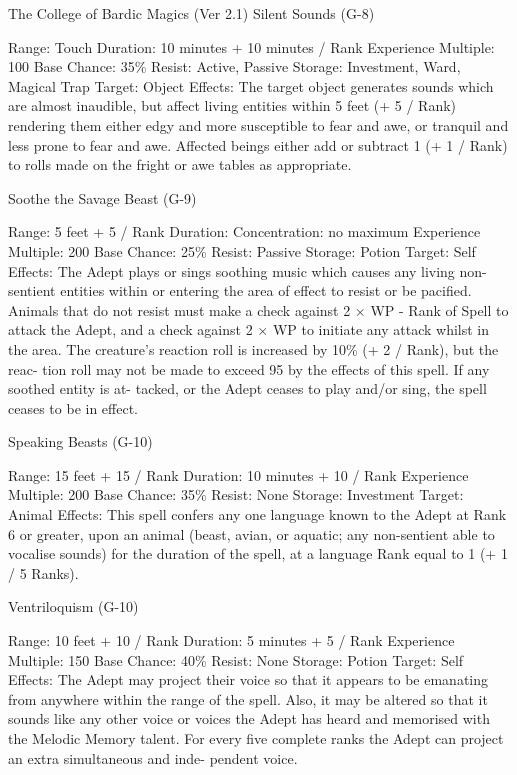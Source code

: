 \begin{Chapter}{The College of Bardic Magics (Ver 2.1)}
Silent Sounds (G-8) 

Range: Touch 
Duration: 10 minutes + 10 minutes / Rank 
Experience Multiple: 100 
Base Chance: 35\% 
Resist: Active, Passive 
Storage: Investment, Ward, Magical Trap 
Target: Object 
Effects:  The  target  object  generates  sounds  which 
are  almost  inaudible,  but  affect  living  entities 
within  5  feet  (+  5  /  Rank)  rendering  them  either 
edgy  and  more  susceptible  to  fear  and  awe,  or 
tranquil  and  less  prone  to  fear  and  awe.  Affected 
beings either add or subtract 1 (+ 1 / Rank) to rolls 
made on the fright or awe tables as appropriate. 

Soothe the Savage Beast (G-9) 

Range: 5 feet + 5 / Rank 
Duration: Concentration: no maximum 
Experience Multiple: 200 
Base Chance: 25\% 
Resist: Passive 
Storage: Potion 
Target: Self 
Effects:  The  Adept  plays  or  sings  soothing  music 
which  causes  any  living  non-sentient  entities 
within or entering the area of  effect to resist or be 
pacified.  Animals  that  do  not  resist  must  make  a 
check against 2 × WP - Rank of Spell to attack the 
Adept, and a check against 2 × WP to initiate any 
attack  whilst  in  the  area.  The  creature’s  reaction 
roll is increased by 10\% (+ 2 / Rank), but the reac-
tion  roll  may  not  be  made  to  exceed  95  by  the 
effects  of  this  spell.  If  any  soothed  entity  is  at-
tacked, or the Adept ceases to play and/or sing, the 
spell ceases to be in effect. 

Speaking Beasts (G-10) 

Range: 15 feet + 15 / Rank 
Duration: 10 minutes + 10 / Rank 
Experience Multiple: 200 
Base Chance: 35\% 
Resist: None 
Storage: Investment 
Target: Animal 
Effects: This spell confers any one language known 
to the Adept at Rank 6 or greater, upon an animal 
(beast,  avian,  or  aquatic;  any  non-sentient  able  to 
vocalise  sounds)  for  the  duration  of  the  spell,  at  a 
language Rank equal to 1 (+ 1 / 5 Ranks). 

Ventriloquism (G-10) 

Range: 10 feet + 10 / Rank 
Duration: 5 minutes + 5 / Rank 
Experience Multiple: 150 
Base Chance: 40\% 
Resist: None 
Storage: Potion 
Target: Self 
Effects:  The  Adept  may  project their  voice  so  that 
it  appears  to  be  emanating  from  anywhere  within 
the  range  of  the  spell.  Also,  it  may  be  altered  so 
that  it  sounds  like  any  other  voice  or  voices  the 
Adept  has  heard  and  memorised  with  the  Melodic 
Memory  talent.  For  every  five  complete  ranks  the 
Adept can project an extra simultaneous and inde-
pendent voice. 


\end{Chapter}
